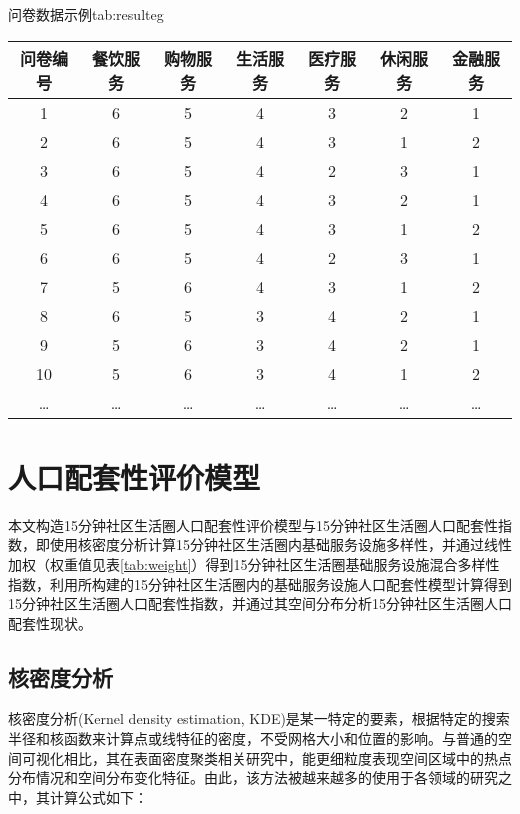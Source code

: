 \documentclass{shnuthesis}
\begin{document}
\begin{generaltab}{问卷数据示例}{tab:resulteg}
	\begin{tabularx}{0.85\textwidth}{ccccccc}
		\toprule[1.5pt]
		问卷编号 & 餐饮服务 & 购物服务 & 生活服务 & 医疗服务 & 休闲服务 & 金融服务 \\
		\midrule
		1    & 6    & 5    & 4    & 3    & 2    & 1    \\
		2    & 6    & 5    & 4    & 3    & 1    & 2    \\
		3    & 6    & 5    & 4    & 2    & 3    & 1    \\
		4    & 6    & 5    & 4    & 3    & 2    & 1    \\
		5    & 6    & 5    & 4    & 3    & 1    & 2    \\
		6    & 6    & 5    & 4    & 2    & 3    & 1    \\
		7    & 5    & 6    & 4    & 3    & 1    & 2    \\
		8    & 6    & 5    & 3    & 4    & 2    & 1    \\
		9    & 5    & 6    & 3    & 4    & 2    & 1    \\
		10   & 5    & 6    & 3    & 4    & 1    & 2    \\
		…    & …    & …    & …    & …    & …    & …  \\
		\bottomrule[1.5pt] 
	\end{tabularx}
\end{generaltab}

\section{人口配套性评价模型}

本文构造15分钟社区生活圈人口配套性评价模型与15分钟社区生活圈人口配套性指数，即使用核密度分析计算15分钟社区生活圈内基础服务设施多样性，并通过线性加权（权重值见表\ref{tab:weight}）得到15分钟社区生活圈基础服务设施混合多样性指数，利用所构建的15分钟社区生活圈内的基础服务设施人口配套性模型计算得到15分钟社区生活圈人口配套性指数，并通过其空间分布分析15分钟社区生活圈人口配套性现状。

\subsection{核密度分析}

核密度分析(Kernel density estimation, KDE)是某一特定的要素，根据特定的搜索半径和核函数来计算点或线特征的密度，不受网格大小和位置的影响\textsuperscript{\cite{silverman2018}}。与普通的空间可视化相比，其在表面密度聚类相关研究中，能更细粒度表现空间区域中的热点分布情况和空间分布变化特征。由此，该方法被越来越多的使用于各领域的研究之中\textsuperscript{\cite{hu2019,yin2020}}，其计算公式如下：
\end{document}
